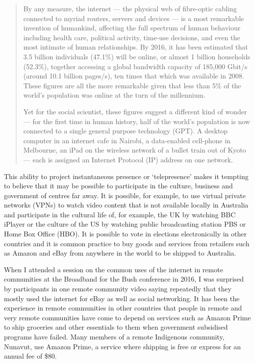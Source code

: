 \begin{quotation}
By any measure, the internet --- the physical web of fibre-optic cabling connected to myriad routers, servers and devices --- is a most remarkable invention of humankind, affecting the full spectrum of human behaviour including health care, political activity, time-use decisions, and even the most intimate of human relationships. By 2016, it has been estimated that 3.5 billion individuals (47.1\%)
will be online, or almost 1 billion households (52.3\%), together accessing a global bandwidth capacity of 185,000 Gbit/s (around 10.1 billion pages/s), ten times that which was available in 2008. These figures are all the more remarkable given that less than 5\% of the world's population was online at the turn of the millennium.

Yet for the social scientist, these figures suggest a different kind of wonder --- for the first time in human history, half of the world's population is now connected to a single general purpose technology (GPT). A desktop computer in an internet cafe in Nairobi, a data-enabled cell-phone in Melbourne, an iPad on the wireless network of a bullet train out of Kyoto --- each is assigned an Internet Protocol (IP) address on one network\cite{RefWorks:214}.
\end{quotation}

This ability to project instantaneous presence or `telepresence' makes it tempting to believe that it may be possible to participate in  the culture, business and government of centres far away. It is possible, for example, to use virtual private networks (VPNs) to watch video content that is not available locally in Australia and participate in the cultural life of, for example, the UK by watching BBC iPlayer or the culture of the US by watching public broadcasting station PBS or Home Box Office (HBO). It is possible to vote in elections electronically in other countries and it is common practice to buy goods and services from retailers such as Amazon and eBay from anywhere in the world to be shipped to Australia.

When I attended a session on the common uses of the internet in remote communities at the Broadband for the Bush conference in 2016, I was surprised by participants in one remote community video saying repeatedly that they mostly used the internet for eBay as well as social networking. %
It has been the experience in remote communities in other countries that people in remote and very remote communities have come to depend on services such as Amazon Prime to ship groceries and other essentials to them when government subsidised programs have failed. Many members of a remote Indigenous community, Nunavut, use Amazon Prime, a service where shipping is free or express for an annual fee of \$80.

